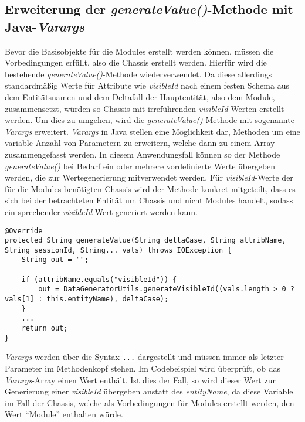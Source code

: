 \subsection{Erweiterung der \textit{generateValue()}-Methode mit Java-\textit{Varargs}}\label{subsec:varargs}
Bevor die Basisobjekte für die Modules erstellt werden können, müssen die Vorbedingungen erfüllt, also die Chassis erstellt werden. Hierfür wird die bestehende \textit{generateValue()}-Methode wiederverwendet. Da diese allerdings standardmäßig Werte für Attribute wie \textit{visibleId} nach einem festen Schema aus dem Entitätsnamen und dem Deltafall der Hauptentität, also dem Module, zusammensetzt, würden so Chassis mit irreführenden \textit{visibleId}-Werten erstellt werden. Um dies zu umgehen, wird die \textit{generateValue()}-Methode mit sogenannte \textit{Varargs} erweitert. \textit{Varargs} in Java stellen eine Möglichkeit dar, Methoden um eine variable Anzahl von Parametern zu erweitern, welche dann zu einem Array zusammengefasst werden. \cite[S. 11]{naftalin:2006} In diesem Anwendungsfall können so der Methode \textit{generateValue()} bei Bedarf ein oder mehrere vordefinierte Werte übergeben werden, die zur Wertegenerierung mitverwendet werden. Für \textit{visibleId}-Werte der für die Modules benötigten Chassis wird der Methode konkret mitgeteilt, dass es sich bei der betrachteten Entität um Chassis und nicht Modules handelt, sodass ein sprechender \textit{visibleId}-Wert generiert werden kann.

\begin{lstlisting}[caption=Einsatz von \textit{Varargs} in der \textit{generateValue()}-Methode, label=varagsCode,style=Javastyle]
@Override
protected String generateValue(String deltaCase, String attribName, String sessionId, String... vals) throws IOException {
    String out = "";
    
    if (attribName.equals("visibleId")) {
        out = DataGeneratorUtils.generateVisibleId((vals.length > 0 ? vals[1] : this.entityName), deltaCase);
    }
    ...
    return out;
}
\end{lstlisting}

\textit{Varargs} werden über die Syntax \colorbox{background}{\lstinline{...}} dargestellt und müssen immer als letzter Parameter im Methodenkopf stehen. Im Codebeispiel wird überprüft, ob das \textit{Varargs}-Array einen Wert enthält. Ist dies der Fall, so wird dieser Wert zur Generierung einer \textit{visibleId} übergeben anstatt des \textit{entityName}, da diese Variable im Fall der Chassis, welche als Vorbedingungen für Modules erstellt werden, den Wert \enquote{Module} enthalten würde.

